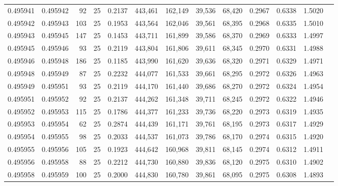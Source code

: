 \begin{tabular}{rrrrrrrrrrrrr}
0.495941 & 0.495942 &    92 &  25 &                                     0.2137 & 443,461 & 162,149 &  39,536 &  68,420 & 0.2967 & 0.6338 & 1.5020 \\
0.495942 & 0.495943 &   103 &  25 &                                     0.1953 & 443,564 & 162,046 &  39,561 &  68,395 & 0.2968 & 0.6335 & 1.5010 \\
0.495943 & 0.495945 &   147 &  25 &                                     0.1453 & 443,711 & 161,899 &  39,586 &  68,370 & 0.2969 & 0.6333 & 1.4997 \\
0.495945 & 0.495946 &    93 &  25 &                                     0.2119 & 443,804 & 161,806 &  39,611 &  68,345 & 0.2970 & 0.6331 & 1.4988 \\
0.495946 & 0.495948 &   186 &  25 &                                     0.1185 & 443,990 & 161,620 &  39,636 &  68,320 & 0.2971 & 0.6329 & 1.4971 \\
0.495948 & 0.495949 &    87 &  25 &                                     0.2232 & 444,077 & 161,533 &  39,661 &  68,295 & 0.2972 & 0.6326 & 1.4963 \\
0.495949 & 0.495951 &    93 &  25 &                                     0.2119 & 444,170 & 161,440 &  39,686 &  68,270 & 0.2972 & 0.6324 & 1.4954 \\
0.495951 & 0.495952 &    92 &  25 &                                     0.2137 & 444,262 & 161,348 &  39,711 &  68,245 & 0.2972 & 0.6322 & 1.4946 \\
0.495952 & 0.495953 &   115 &  25 &                                     0.1786 & 444,377 & 161,233 &  39,736 &  68,220 & 0.2973 & 0.6319 & 1.4935 \\
0.495953 & 0.495954 &    62 &  25 &                                     0.2874 & 444,439 & 161,171 &  39,761 &  68,195 & 0.2973 & 0.6317 & 1.4929 \\
0.495954 & 0.495955 &    98 &  25 &                                     0.2033 & 444,537 & 161,073 &  39,786 &  68,170 & 0.2974 & 0.6315 & 1.4920 \\
0.495955 & 0.495956 &   105 &  25 &                                     0.1923 & 444,642 & 160,968 &  39,811 &  68,145 & 0.2974 & 0.6312 & 1.4911 \\
0.495956 & 0.495958 &    88 &  25 &                                     0.2212 & 444,730 & 160,880 &  39,836 &  68,120 & 0.2975 & 0.6310 & 1.4902 \\
0.495958 & 0.495959 &   100 &  25 &                                     0.2000 & 444,830 & 160,780 &  39,861 &  68,095 & 0.2975 & 0.6308 & 1.4893 \\

\end{tabular}
